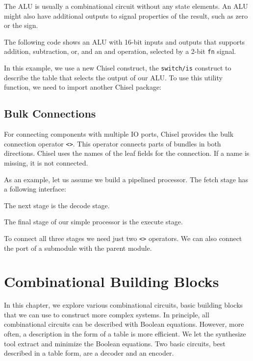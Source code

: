 \documentclass[%
    10pt,
    headinclude, footexclude,
    openright, %
    notitlepage,
    cleardoubleempty,
    headsepline,
    pointlessnumbers,
    bibtotoc, idxtotoc,
    ]{scrbook}
\newcommand{\code}[1]{{\lstinline[basicstyle=\small\ttfamily]{#1}}}
\begin{document}
The ALU is usually a combinational circuit without any state elements.
An ALU might also have additional outputs to signal properties
of the result, such as zero or the sign.

The following code shows an ALU with 16-bit inputs and outputs that supports addition, subtraction, or, and an and
operation, selected by a 2-bit \code{fn} signal.


\noindent In this example, we use a new Chisel construct, the \code{switch/is} construct to describe
the table that selects the output of our ALU.
To use this utility function, we need to import another Chisel package:


\section{Bulk Connections}


For connecting components with multiple IO ports, Chisel provides the
bulk connection operator \code{<>}. This operator connects parts of bundles
in both directions. Chisel uses the names of the leaf fields for the connection.
If a name is missing, it is not connected.

As an example, let us assume we build a pipelined processor. The fetch
stage has a following interface:

\noindent The next stage is the decode stage.

\noindent The final stage of our simple processor is the execute stage.

To connect all three stages we need just two \code{<>} operators.
We can also connect the port of a submodule with the parent module.


\chapter{Combinational Building Blocks}
\label{chap:comb}

In this chapter, we explore various combinational circuits, basic building blocks that we can
use to construct more complex systems.
In principle, all combinational circuits can be described with Boolean equations.
However, more often, a description in the form of a table is more efficient.
We let the synthesize tool extract and minimize the Boolean equations.
Two basic circuits, best described in a table form, are a decoder and an encoder.
\end{document}
